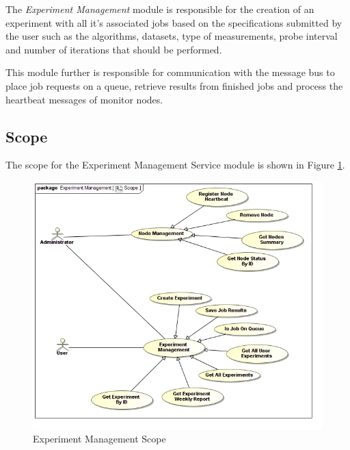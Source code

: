 The \textit{Experiment Management} module is responsible for the creation of an
experiment with all it's associated jobs based on the specifications submitted
by the user such as the algorithms, datasets, type of measurements, probe 
interval and number of iterations that should be performed. 

This module further is responsible for communication with the message bus to
place job requests on a queue, retrieve results from finished jobs and process
the heartbeat messages of monitor nodes.



\subsection{Scope}
The scope for the Experiment Management Service module is shown in Figure \ref{fig:experimentManagementScope}.
\begin{figure}[H]
  \begin{center}
  \includegraphics[scale=0.38]{../Diagrams and Charts/Experiment/Scope.jpg}
  \caption{Experiment Management Scope}
  \label{fig:experimentManagementScope}
  \end{center}
\end{figure}



